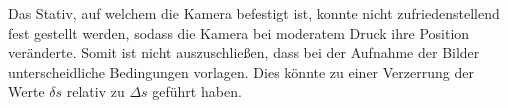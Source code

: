 \noindent
Das Stativ, auf welchem die Kamera befestigt ist, konnte nicht zufriedenstellend fest gestellt werden, sodass
die Kamera bei moderatem Druck ihre Position veränderte. Somit ist nicht auszuschließen, dass bei der 
Aufnahme der Bilder unterscheidliche Bedingungen vorlagen. Dies könnte zu einer Verzerrung der Werte 
$\delta s$ relativ zu $\Delta s$ geführt haben.